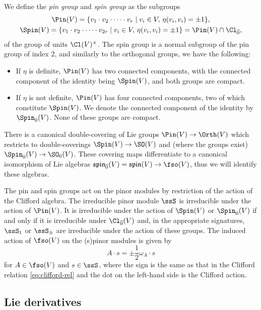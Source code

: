 We define the \emph{pin group} and \emph{spin group} as the subgroups
\begin{gather*}
	\Pin(V) = \{v_1\cdot v_2\cdot\dots\cdot v_{r} \mid v_i\in V, \, \eta(v_i,v_i) = \pm 1 \},	\\
	\Spin(V) = \{v_1\cdot v_2\cdot\dots\cdot v_{2r} \mid v_i\in V, \, \eta(v_i,v_i) = \pm 1 \} = \Pin(V)\cap \Cl_{\overline0},
\end{gather*}
of the group of units $\Cl(V)^\times$. The spin group is a normal subgroup of the pin group of index 2, and similarly to the orthogonal groups, we have the following:
\begin{itemize}\itemsep=0pt
	\item If $\eta$ is definite, $\Pin(V)$ has two connected components, with the connected component of the identity being $\Spin(V)$, and both groups are compact.
	\item If $\eta$ is not definite, $\Pin(V)$ has four connected components, two of which constitute $\Spin(V)$. We denote the connected component of the identity by $\Spin_0(V)$. None of these groups are compact.
\end{itemize}
There is a canonical double-covering of Lie groups $\Pin(V)\to\Orth(V)$ which restricts to double-coverings $\Spin(V)\to \SO(V)$ and (where the groups exist) $\Spin_0(V)\to\SO_0(V)$. These covering maps differentiate to a canonical isomorphism of Lie algebras $\mathfrak{spin}_{\overline0}(V)=\mathfrak{spin}(V)\to\fso(V)$, thus we will identify these algebras.

The pin and spin groups act on the pinor modules by restriction of the action of the Clifford algebra. The irreducible pinor module $\ssS$ is irreducible under the action of $\Pin(V)$. It is irreducible under the action of $\Spin(V)$ or $\Spin_0(V)$ if and only if it is irreducible under $\Cl_{\overline 0}(V)$ and, in the appropriate signatures, $\ssS_1$ or $\ssS_\pm$ are irreducible under the action of these groups. The induced action of $\fso(V)$ on the (s)pinor modules is given by
\begin{equation}\label{eq:sov-spinor-action}
	A\cdot s = \pm\frac{1}{2}\omega_A\cdot s
\end{equation}
for $A\in\fso(V)$ and $s\in \ssS$, where the sign is the same as that in the Clifford relation \eqref{eq:clifford-rel} and the dot on the left-hand side is the Clifford action.

\subsection{Lie derivatives}
\label{sec:lie-der}

